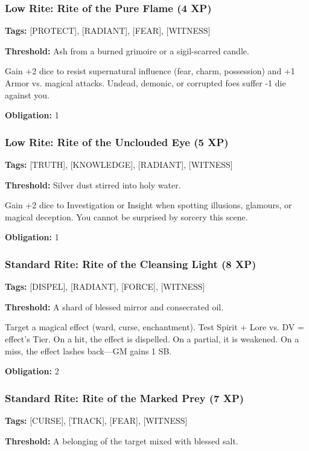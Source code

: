 \subsubsection{Low Rite: Rite of the Pure Flame (4 XP)}

\textbf{Tags:} [PROTECT], [RADIANT], [FEAR], [WITNESS]

\textbf{Threshold:} Ash from a burned grimoire or a sigil-scarred candle.

Gain +2 dice to resist supernatural influence (fear, charm, possession) and +1 Armor vs. magical attacks. Undead, demonic, or corrupted foes suffer -1 die against you.

\textbf{Obligation:} 1

\subsubsection{Low Rite: Rite of the Unclouded Eye (5 XP)}

\textbf{Tags:} [TRUTH], [KNOWLEDGE], [RADIANT], [WITNESS]

\textbf{Threshold:} Silver dust stirred into holy water.

Gain +2 dice to Investigation or Insight when spotting illusions, glamours, or magical deception. You cannot be surprised by sorcery this scene.

\textbf{Obligation:} 1

\subsubsection{Standard Rite: Rite of the Cleansing Light (8 XP)}

\textbf{Tags:} [DISPEL], [RADIANT], [FORCE], [WITNESS]

\textbf{Threshold:} A shard of blessed mirror and consecrated oil.

Target a magical effect (ward, curse, enchantment). Test Spirit + Lore vs. DV = effect's Tier. On a hit, the effect is dispelled. On a partial, it is weakened. On a miss, the effect lashes back—GM gains 1 SB.

\textbf{Obligation:} 2

\subsubsection{Standard Rite: Rite of the Marked Prey (7 XP)}

\textbf{Tags:} [CURSE], [TRACK], [FEAR], [WITNESS]

\textbf{Threshold:} A belonging of the target mixed with blessed salt.

